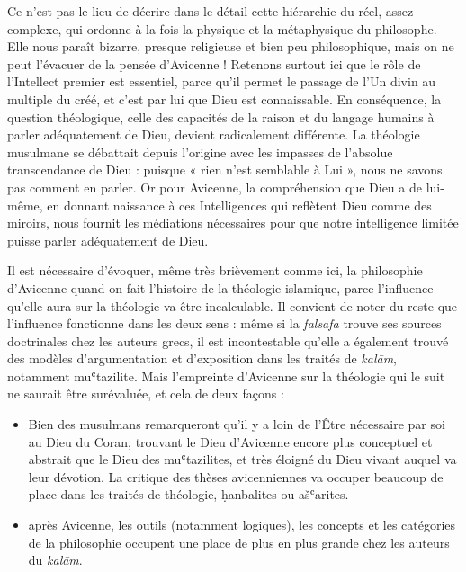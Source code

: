 Ce n'est pas le lieu de décrire dans le détail cette hiérarchie du réel,
assez complexe, qui ordonne à la fois la physique et la métaphysique du
philosophe. Elle nous paraît bizarre, presque religieuse et bien peu
philosophique, mais on ne peut l'évacuer de la pensée d'Avicenne  !
Retenons surtout ici que le rôle de l'Intellect premier est essentiel,
parce qu'il permet le passage de l'Un divin au multiple du créé, et
c'est par lui que Dieu est connaissable. En conséquence, la question
théologique, celle des capacités de la raison et du langage humains à
parler adéquatement de Dieu, devient radicalement différente. La
théologie musulmane se débattait depuis l'origine avec les impasses de
l'absolue transcendance de Dieu : puisque « rien n'est semblable à Lui
», nous ne savons pas comment en parler. Or pour Avicenne, la
compréhension que Dieu a de lui-même, en donnant naissance à ces
Intelligences qui reflètent Dieu comme des miroirs, nous fournit les
médiations nécessaires pour que notre intelligence limitée puisse parler
adéquatement de Dieu.

Il est nécessaire d'évoquer, même très brièvement comme ici, la
philosophie d'Avicenne quand on fait l'histoire de la théologie
islamique, parce l'influence qu'elle aura sur la théologie va être
incalculable. Il convient de noter du reste que l'influence fonctionne
dans les deux sens : même si la \emph{falsafa} trouve ses sources
doctrinales chez les auteurs grecs, il est incontestable qu'elle a
également trouvé des modèles d'argumentation et d'exposition dans
les traités de \emph{kalām}, notamment muʿtazilite. Mais l'empreinte
d'Avicenne sur la théologie qui
le suit ne saurait être surévaluée, et cela de deux façons :


\begin{itemize}
\item
  
  Bien des musulmans remarqueront qu'il y a loin de l'Être nécessaire
  par soi au Dieu du Coran, trouvant le Dieu d'Avicenne encore plus
  conceptuel et abstrait que le Dieu des muʿtazilites, et très éloigné
  du Dieu vivant auquel va leur dévotion. La critique des thèses
  avicenniennes va occuper beaucoup de place dans les traités de
  théologie, ḥanbalites ou ašʿarites.
  
\item
  
  après Avicenne, les outils (notamment logiques), les concepts et les
  catégories de la philosophie occupent une place de plus en plus grande
  chez les auteurs du \emph{kalām}.
  
\end{itemize}


